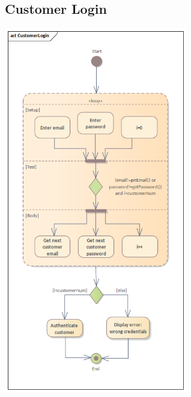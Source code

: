 \subsection{Customer Login}
\begin{center}
  \includegraphics[width=0.6\textwidth]{immagini/Analisi/ActivityDiagrams/CustomerLogin.png}
\end{center}

